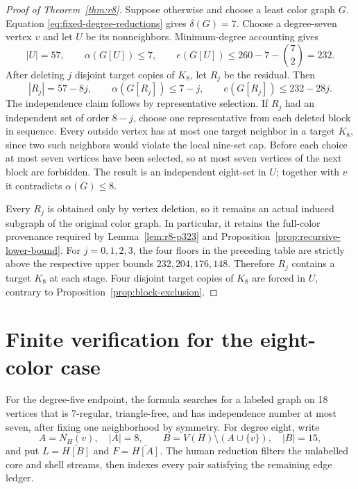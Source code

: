 \documentclass[11pt,reqno,a4paper]{amsart}
\theoremstyle{definition}
\theoremstyle{remark}
\newcommand{\comp}[1]{\overline{#1}}
\begin{document}
\begin{proof}[Proof of Theorem~\ref{thm:r8}]
Suppose otherwise and choose a least color graph $G$. Equation
\eqref{eq:fixed-degree-reductions} gives $\delta(G)=7$. Choose a
degree-seven vertex $v$ and let $U$ be its nonneighbors. Minimum-degree
accounting gives
\[
 |U|=57,
 \qquad \alpha(G[U])\leq7,
 \qquad e(G[U])\leq260-7-\binom72=232.
\]
After deleting $j$ disjoint target copies of $K_8$, let $R_j$ be the
residual. Then
\begin{equation}\label{eq:r8-residual-data}
 |R_j|=57-8j,
 \qquad \alpha(G[R_j])\leq7-j,
 \qquad e(G[R_j])\leq232-28j.
\end{equation}
The independence claim follows by representative selection. If $R_j$
had an independent set of order $8-j$, choose one representative from
each deleted block in sequence. Every outside vertex has at most one
target neighbor in a target $K_8$, since two such neighbors would violate
the local nine-set cap. Before each choice at most seven vertices have
been selected, so at most seven vertices of the next block are forbidden.
The result is an independent eight-set in $U$; together with $v$ it
contradicts $\alpha(G)\leq8$.

Every $R_j$ is obtained only by vertex deletion, so it remains an actual
induced subgraph of the original color graph. In particular, it retains
the full-color provenance required by Lemma~\ref{lem:r8-p323} and
Proposition~\ref{prop:recursive-lower-bound}. For $j=0,1,2,3$, the four
floors in the preceding table are strictly above the respective upper
bounds $232,204,176,148$. Therefore $R_j$ contains a target $K_8$ at
each stage. Four disjoint target copies of $K_8$ are forced in $U$,
contrary to Proposition~\ref{prop:block-exclusion}.
\end{proof}

\section{Finite verification for the eight-color case}\label{sec:finite-r8}

For the degree-five endpoint, the formula searches for a labeled graph on
18 vertices that is 7-regular, triangle-free, and has independence number
at most seven, after fixing one neighborhood by symmetry. For degree eight,
write
\[
  A=N_H(v),\quad |A|=8,
  \qquad B=V(H)\setminus(A\cup\{v\}),\quad |B|=15,
\]
and put $L=\comp{H[B]}$ and $F=\comp{H[A]}$. The human reduction filters
the unlabelled core and shell streams, then indexes every pair satisfying
the remaining edge ledger.
\end{document}
